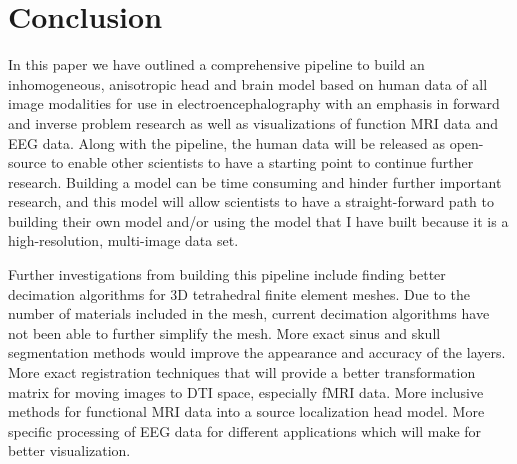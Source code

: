 %
%

\section{Conclusion}
\label{sec:Conclusion}

In this paper we have outlined a comprehensive pipeline to build an inhomogeneous, anisotropic head and brain model based on human data of all image modalities for use in electroencephalography with an emphasis in forward and inverse problem research as well as visualizations of function MRI data and EEG data. Along with the pipeline, the human data will be released as open-source to enable other scientists to have a starting point to continue further research. Building a model can be time consuming and hinder further important research, and this model will allow scientists to have a straight-forward path to building their own model and/or using the model that I have built because it is a high-resolution, multi-image data set.

Further investigations from building this pipeline include finding better decimation algorithms for 3D tetrahedral finite element meshes. Due to the number of materials included in the mesh, current decimation algorithms have not been able to further simplify the mesh. More exact sinus and skull segmentation methods would improve the appearance and accuracy of the layers. More exact registration techniques that will provide a better transformation matrix for moving images to DTI space, especially fMRI data. More inclusive methods for functional MRI data into a source localization head model. More specific processing of EEG data for different applications which will make for better visualization. 